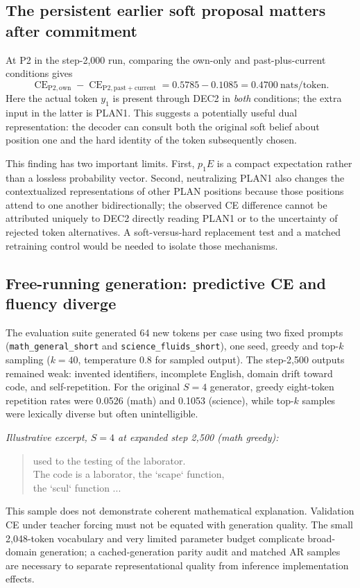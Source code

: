 \documentclass[11pt,letterpaper]{article}
\newcommand{\CE}{\operatorname{CE}}
\newcommand{\code}[1]{\texttt{#1}}
\begin{document}
\subsection{The persistent earlier soft proposal matters after commitment}
At P2 in the step-2,000 run, comparing the own-only and past-plus-current conditions gives
\begin{equation}
 \CE_{\mathrm{P2,own}}-\CE_{\mathrm{P2,past+current}}=0.5785-0.1085=\boxed{0.4700}\ \text{nats/token}.
 \label{eq:p2}
\end{equation}
Here the actual token $y_1$ is present through DEC2 in \emph{both} conditions; the extra input in the latter is PLAN1. This suggests a potentially useful dual representation: the decoder can consult both the original soft belief about position one and the hard identity of the token subsequently chosen.

This finding has two important limits. First, $p_1E$ is a compact expectation rather than a lossless probability vector. Second, neutralizing PLAN1 also changes the contextualized representations of other PLAN positions because those positions attend to one another bidirectionally; the observed CE difference cannot be attributed uniquely to DEC2 directly reading PLAN1 or to the uncertainty of rejected token alternatives. A soft-versus-hard replacement test and a matched retraining control would be needed to isolate those mechanisms.

\subsection{Free-running generation: predictive CE and fluency diverge}
The evaluation suite generated 64 new tokens per case using two fixed prompts (\code{math\_general\_short} and \code{science\_fluids\_short}), one seed, greedy and top-$k$ sampling ($k=40$, temperature 0.8 for sampled output). The step-2,500 outputs remained weak: invented identifiers, incomplete English, domain drift toward code, and self-repetition. For the original $S=4$ generator, greedy eight-token repetition rates were 0.0526 (math) and 0.1053 (science), while top-$k$ samples were lexically diverse but often unintelligible.

\noindent\textit{Illustrative excerpt, $S=4$ at expanded step 2,500 (math greedy):}
\begin{quote}\small\ttfamily
used to the testing of the laborator.\\
The code is a laborator, the `scape` function,\\
the `scul` function ...
\end{quote}
This sample does not demonstrate coherent mathematical explanation. Validation CE under teacher forcing must not be equated with generation quality. The small 2,048-token vocabulary and very limited parameter budget complicate broad-domain generation; a cached-generation parity audit and matched AR samples are necessary to separate representational quality from inference implementation effects.
\end{document}
